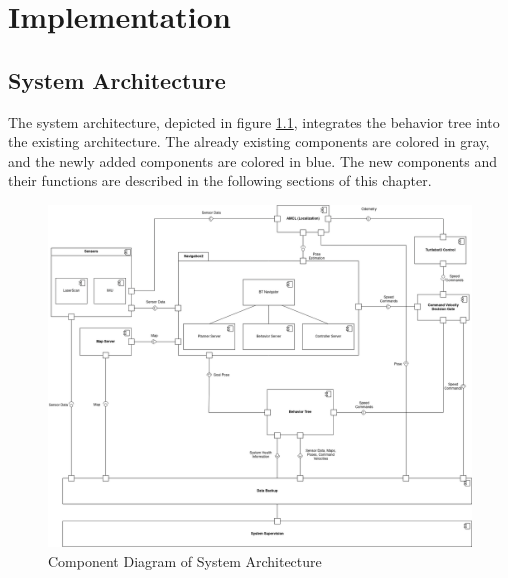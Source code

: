 \chapter{Implementation}
\label{cha:implementierung}

\section{System Architecture}

The system architecture, depicted in figure \ref{fig:component_diagram}, integrates the behavior tree into the existing architecture. 
The already existing components are colored in gray, and the newly added components are colored in blue.
The new components and their functions are described in the following sections of this chapter.  

\begin{figure}[ht]
	\includegraphics[width=1.00\textwidth]{images/component_diagram_bt.png}
	\caption{Component Diagram of System Architecture}
	\label{fig:component_diagram}
\end{figure}

